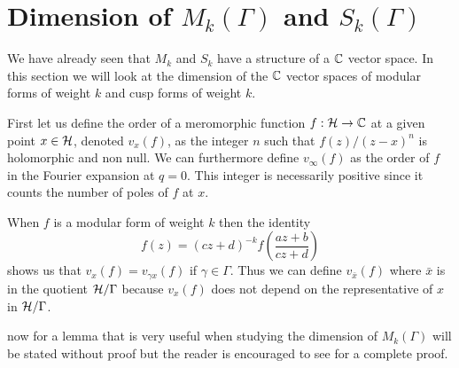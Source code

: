 \section{Dimension of $M_k(\Gamma)$ and $S_k(\Gamma)$}
We have already seen that $M_k$ and $S_k$ have a structure of a $\mathbb C$ vector space. In this section we will look at the dimension of the $\mathbb C$ vector spaces of modular forms of 
weight $k$ and cusp forms of weight $k$.

\mb 

First let us define the order of a meromorphic function $f:\mathcal{H} \rightarrow{} \mathbb C$ at a given point $x\in \mathcal{H}$,
 denoted $v_x(f)$, as the integer $n$ such that $f(z)/(z-x)^n$ is holomorphic and non null. We can 
 furthermore define $v_\infty(f)$ as the order of $f$ in the Fourier expansion at $q=0$. This integer 
 is necessarily positive since it counts the number of poles of $f$ at $x$.
 
\mb 

When $f$ is a modular form of weight $k$ then the identity
\[f(z) = (cz+d)^{-k}f(\frac{az+b}{cz+d})\]
shows us that $v_x(f) = v_{\gamma x}(f)$ if $\gamma \in \Gamma$. Thus we can define $v_{\bar{x}}(f)$
where $\bar{x}$ is in the quotient $\mathcal{H}/\Gamma$ because $v_x(f)$ does not depend on 
the representative of $x$ in $\mathcal{H}/\Gamma$.


\mb

now for a lemma that is very useful when studying the dimension of $M_k(\Gamma)$ will be stated without 
proof but the reader is encouraged to see \cite{Serre:1993} for a complete proof.


